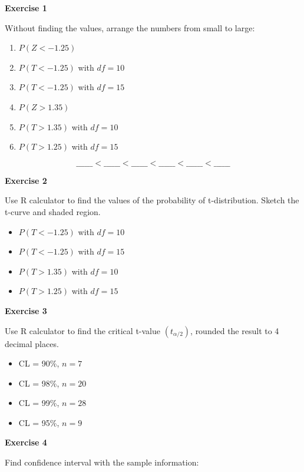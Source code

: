\documentclass[
]{book}
\providecommand{\tightlist}{%
  \setlength{\itemsep}{0pt}\setlength{\parskip}{0pt}}
\begin{document}
\textbf{Exercise 1}

Without finding the values, arrange the numbers from small to large:

\begin{enumerate}
\def\labelenumi{\alph{enumi})}
\tightlist
\item
  \(P(Z < -1.25)\)\\
\item
  \(P(T < -1.25)\) with \(df=10\)\\
\item
  \(P(T < -1.25)\) with \(df=15\)\\
\item
  \(P(Z > 1.35)\)\\
\item
  \(P(T > 1.35)\) with \(df=10\)\\
\item
  \(P(T > 1.25)\) with \(df=15\)
\end{enumerate}

\[ \_\_\_\_\_\_ < \_\_\_\_\_\_ < \_\_\_\_\_\_ < \_\_\_\_\_\_ < \_\_\_\_\_\_ < \_\_\_\_\_\_ \]

\textbf{Exercise 2}

Use R calculator to find the values of the probability of t-distribution. Sketch the t-curve and shaded region.

\begin{itemize}
\tightlist
\item
  \(P(T < -1.25)\) with \(df=10\)
\item
  \(P(T < -1.25)\) with \(df=15\)
\item
  \(P(T > 1.35)\) with \(df=10\)
\item
  \(P(T > 1.25)\) with \(df=15\)
\end{itemize}

\textbf{Exercise 3}

Use R calculator to find the critical t-value \((t_{\alpha/2})\), rounded the result to 4 decimal places.

\begin{itemize}
\tightlist
\item
  CL = 90\%, \(n = 7\)
\item
  CL = 98\%, \(n = 20\)
\item
  CL = 99\%, \(n = 28\)
\item
  CL = 95\%, \(n = 9\)
\end{itemize}

\textbf{Exercise 4}

Find confidence interval with the sample information:
\end{document}
